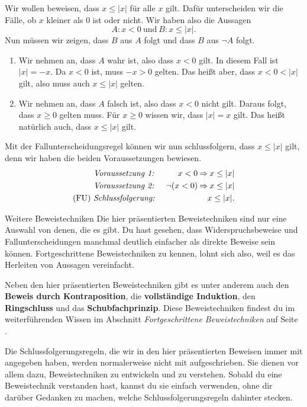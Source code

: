 \documentclass[../../main.tex]{subfiles}
\begin{document}
\begin{example}{}
    Wir wollen beweisen, dass $x\leq |x|$ für alle $x$ gilt. Dafür unterscheiden wir die Fälle, ob $x$ kleiner als $0$ ist oder nicht. Wir haben also die Aussagen
    \[A:x<0~\text{und}~B:x\leq |x|.\]
    Nun müssen wir zeigen, dass $B$ aus $A$ folgt und dass $B$ aus $\lnot A$ folgt.
    \begin{enumerate}
         \item
            Wir nehmen an, dass $A$ wahr ist, also dass $x<0$ gilt. In diesem Fall ist $|x|=-x$. Da $x<0$ ist, muss $-x>0$ gelten. Das heißt aber, dass $x<0<|x|$ gilt, also muss auch $x\leq |x|$ gelten.
         \item
            Wir nehmen an, dass $A$ falsch ist, also dass $x<0$ nicht gilt. Daraus folgt, dass $x\geq 0$ gelten muss. Für $x\geq 0$ wissen wir, dass $|x|=x$ gilt. Das heißt natürlich auch, dass $x\leq |x|$ gilt.
    \end{enumerate}
    Mit der Fallunterscheidungsregel können wir nun schlussfolgern, dass $x\leq |x|$ gilt, denn wir haben die beiden Voraussetzungen bewiesen.
    \begin{align*}
        &\text{\emph{Voraussetzung~1:}}~&x<0 \mathbin{\Rightarrow} x\leq |x|\\
        &\text{\emph{Voraussetzung~2:}}~&\lnot (x<0) \mathbin{\Rightarrow} x\leq |x|\\
        \text{(FU)}~&\text{\emph{Schlussfolgerung:}}~&x\leq |x|.
    \end{align*}
\end{example}

\begin{advanced}{Weitere Beweistechniken}
    Die hier präsentierten Beweistechniken sind nur eine Auswahl von denen, die es gibt. Du hast gesehen, dass Widerspruchsbeweise und Fallunterscheidungen manchmal deutlich einfacher als direkte Beweise sein können. Fortgeschrittene Beweistechniken zu kennen, lohnt sich also, weil es das Herleiten von Aussagen vereinfacht.

    Neben den hier präsentierten Beweistechniken gibt es unter anderem auch den \textbf{Beweis durch Kontraposition}, die \textbf{vollständige Induktion}, den \textbf{Ringschluss} und das \textbf{Schubfachprinzip}. Diese Beweistechniken findest du im weiterführenden Wissen im Abschnitt \emph{Fortgeschrittene Beweistechniken} auf Seite \pageref{advanced-proofs}.
\end{advanced}

Die Schlussfolgerungsregeln, die wir in den hier präsentierten Beweisen immer mit angegeben haben, werden normalerweise nicht mit aufgeschrieben. Sie dienen vor allem dazu, Beweistechniken zu entwickeln und zu verstehen. Sobald du eine Beweistechnik verstanden hast, kannst du sie einfach verwenden, ohne dir darüber Gedanken zu machen, welche Schlussfolgerungsregeln dahinter stecken.
\end{document}
